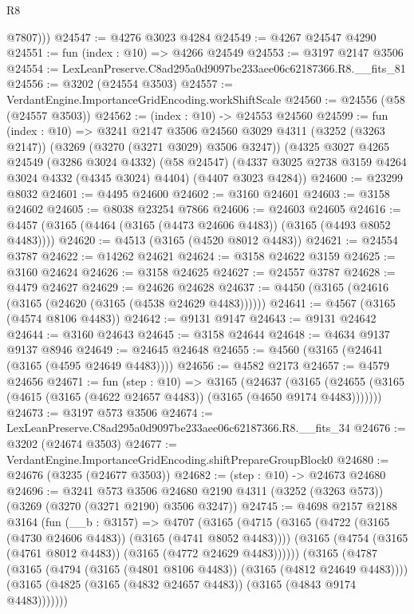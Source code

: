 \begin{lexlean}{R8}
\begin{coremodule}
          @7807)))
@24547 := @4276 @3023 @4284
@24549 := @4267 @24547 @4290
@24551 := fun (index : @10) => @4266 @24549
@24553 := @3197 @2147 @3506
@24554 := LexLeanPreserve.C8ad295a0d9097be233aee06c62187366.R8.__fits_81
@24556 := @3202 (@24554 @3503)
@24557 := VerdantEngine.ImportanceGridEncoding.workShiftScale
@24560 := @24556 (@58 (@24557 @3503))
@24562 := (index : @10) -> @24553 @24560
@24599 := fun (index : @10) =>
  @3241
    @2147
    @3506
    @24560
    @3029
    @4311
    (@3252 (@3263 @2147))
    (@3269 (@3270 (@3271 @3029) @3506 @3247))
    (@4325
      @3027
      @4265
      @24549
      (@3286 @3024 @4332)
      (@58 @24547)
      (@4337 @3025 @2738 @3159 @4264 @3024 @4332 (@4345 @3024) @4404)
      (@4407 @3023 @4284))
@24600 := @23299 @8032
@24601 := @4495 @24600
@24602 := @3160 @24601
@24603 := @3158 @24602
@24605 := @8038 @23254 @7866
@24606 := @24603 @24605
@24616 := @4457 (@3165 (@4464 (@3165 (@4473 @24606 @4483)) (@3165 (@4493 @8052 @4483))))
@24620 := @4513 (@3165 (@4520 @8012 @4483))
@24621 := @24554 @3787
@24622 := @14262 @24621
@24624 := @3158 @24622 @3159
@24625 := @3160 @24624
@24626 := @3158 @24625
@24627 := @24557 @3787
@24628 := @4479 @24627
@24629 := @24626 @24628
@24637 := @4450 (@3165 (@24616 (@3165 (@24620 (@3165 (@4538 @24629 @4483))))))
@24641 := @4567 (@3165 (@4574 @8106 @4483))
@24642 := @9131 @9147
@24643 := @9131 @24642
@24644 := @3160 @24643
@24645 := @3158 @24644
@24648 := @4634 @9137 @9137 @8946
@24649 := @24645 @24648
@24655 := @4560 (@3165 (@24641 (@3165 (@4595 @24649 @4483))))
@24656 := @4582 @2173
@24657 := @4579 @24656
@24671 := fun (step : @10) =>
  @3165
    (@24637
      (@3165 (@24655 (@3165 (@4615 (@3165 (@4622 @24657 @4483)) (@3165 (@4650 @9174 @4483)))))))
@24673 := @3197 @573 @3506
@24674 := LexLeanPreserve.C8ad295a0d9097be233aee06c62187366.R8.__fits_34
@24676 := @3202 (@24674 @3503)
@24677 := VerdantEngine.ImportanceGridEncoding.shiftPrepareGroupBlock0
@24680 := @24676 (@3235 (@24677 @3503))
@24682 := (step : @10) -> @24673 @24680
@24696 := @3241
    @573
    @3506
    @24680
    @2190
    @4311
    (@3252 (@3263 @573))
    (@3269 (@3270 (@3271 @2190) @3506 @3247))
@24745 := @4698
    @2157
    @2188
    @3164
    (fun (__b : @3157) =>
    @4707
      (@3165
        (@4715
          (@3165 (@4722 (@3165 (@4730 @24606 @4483)) (@3165 (@4741 @8052 @4483))))
          (@3165 (@4754 (@3165 (@4761 @8012 @4483)) (@3165 (@4772 @24629 @4483))))))
      (@3165
        (@4787
          (@3165 (@4794 (@3165 (@4801 @8106 @4483)) (@3165 (@4812 @24649 @4483))))
          (@3165 (@4825 (@3165 (@4832 @24657 @4483)) (@3165 (@4843 @9174 @4483)))))))

\end{coremodule}
\end{lexlean}

